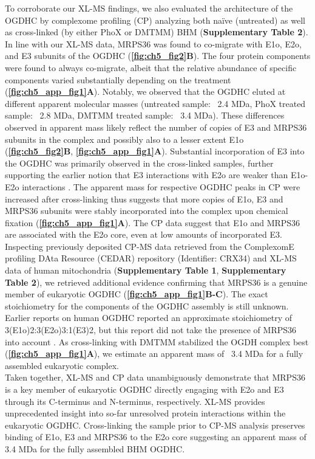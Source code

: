 To corroborate our XL-MS findings, we also evaluated the architecture of the OGDHC by complexome profiling (CP) analyzing both naïve (untreated) as well as cross-linked (by either PhoX or DMTMM) BHM (\textbf{Supplementary Table 2}). In line with our XL-MS data, MRPS36 was found to co-migrate with E1o, E2o, and E3 subunits of the OGDHC (\textbf{\autoref{fig:ch5_fig2}B}). The four protein components were found to always co-migrate, albeit that the relative abundance of specific components varied substantially depending on the treatment (\textbf{\autoref{fig:ch5_app_fig1}A}). Notably, we observed that the OGDHC eluted at different apparent molecular masses (untreated sample: ~2.4 MDa, PhoX treated sample: ~2.8 MDa, DMTMM treated sample: ~3.4 MDa). These differences observed in apparent mass likely reflect the number of copies of E3 and MRPS36 subunits in the complex and possibly also to a lesser extent E1o (\textbf{\autoref{fig:ch5_fig2}B}, \textbf{\autoref{fig:ch5_app_fig1}A}). Substantial incorporation of E3 into the OGDHC was primarily observed in the cross-linked samples, further supporting the earlier notion that E3 interactions with E2o are weaker than E1o-E2o interactions \cite{Zhou_2018}. The apparent mass for respective OGDHC peaks in CP were increased after cross-linking thus suggests that more copies of E1o, E3 and MRPS36 subunits were stably incorporated into the complex upon chemical fixation (\textbf{\autoref{fig:ch5_app_fig1}A}). The CP data suggest that E1o and MRPS36 are associated with the E2o core, even at low amounts of incorporated E3. Inspecting previously deposited CP-MS data retrieved from the ComplexomE profiling DAta Resource (CEDAR) repository \cite{Strien_2021} (Identifier: CRX34) and XL-MS data of human mitochondria \cite{Ryl_2020} (\textbf{Supplementary Table 1}, \textbf{Supplementary Table 2}), we retrieved additional evidence confirming that MRPS36 is a genuine member of eukaryotic OGDHC (\textbf{\autoref{fig:ch5_app_fig1}B-C}). The exact stoichiometry for the components of the OGDHC assembly is still unknown. Earlier reports on human OGDHC reported an approximate stoichiometry of 3(E1o)2:3(E2o)3:1(E3)2, but this report did not take the presence of MRPS36 into account \cite{Zhou_2018}. As cross-linking with DMTMM stabilized the OGDH complex best (\textbf{\textbf{\autoref{fig:ch5_app_fig1}A}}), we estimate an apparent mass of ~3.4 MDa for a fully assembled eukaryotic complex.\\ 
Taken together, XL-MS and CP data unambiguously demonstrate that MRPS36 is a key member of eukaryotic OGDHC directly engaging with E2o and E3 through its C-terminus and N-terminus, respectively. XL-MS provides unprecedented insight into so-far unresolved protein interactions within the eukaryotic OGDHC. Cross-linking the sample prior to CP-MS analysis preserves binding of E1o, E3 and MRPS36 to the E2o core suggesting an apparent mass of 3.4 MDa for the fully assembled BHM OGDHC.

